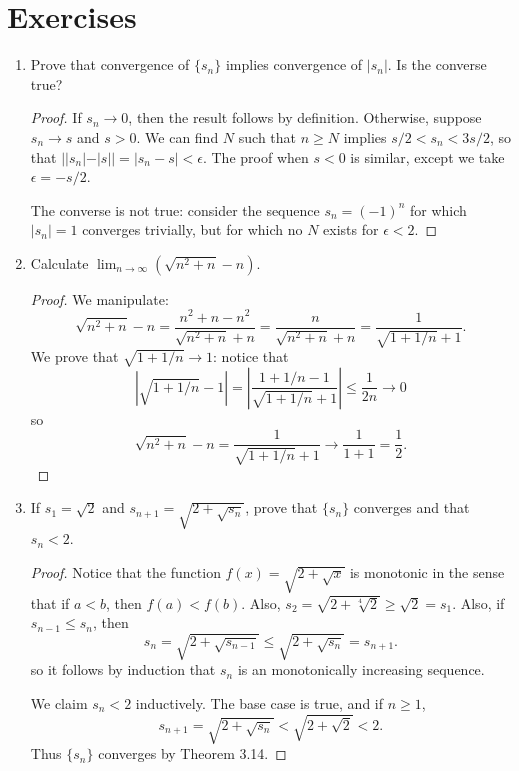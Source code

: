 \section{Exercises}

\begin{enumerate}
\item %
Prove that convergence of $\{s_n\}$ implies convergence of $|s_n|$. Is the converse true?

\begin{proof}
If $s_n \to 0$, then the result follows by definition. Otherwise, suppose $s_n \to s$ and $s > 0$. We can find $N$ such that $n \ge N$ implies $s/2 < s_n < 3s/2$, so that $||s_n| - |s|| = |s_n - s| < \epsilon$. The proof when $s < 0$ is similar, except we take $\epsilon = -s/2$.

The converse is not true: consider the sequence $s_n = (-1)^{n}$ for which $|s_n| = 1$ converges trivially, but for which no $N$ exists for $\epsilon < 2$.
\end{proof}

\item %
Calculate $\lim_{n \to \infty} (\sqrt{n^2 + n} - n)$.

\begin{proof}
We manipulate:
\[
	\sqrt{n^2 + n} - n = \frac{n^2 + n - n^2}{\sqrt{n^2 + n} + n} = \frac{n}{\sqrt{n^2 + n} + n} = \frac{1}{\sqrt{1 + 1/n} + 1}.
\]
We prove that $\sqrt{1+1/n} \to 1$: notice that
\[
	|\sqrt{1+1/n} - 1| = \left| \frac{1 + 1/n - 1}{\sqrt{1 + 1/n} + 1} \right| \le \frac{1}{2n} \to 0
\]
so 
\[
	\sqrt{n^2 + n} - n = \frac{1}{\sqrt{1 + 1/n} + 1} \to \frac{1}{1 + 1} = \frac{1}{2}.
\]
\end{proof}

\item %
If $s_1 = \sqrt{2}$ and $s_{n+1} = \sqrt{2 + \sqrt{s_n}}$, prove that $\{s_n\}$ converges and that $s_n < 2$.

\begin{proof}
Notice that the function $f(x) = \sqrt{2 + \sqrt{x}}$ is monotonic in the sense that if $a < b$, then $f(a) < f(b)$. Also, $s_2 = \sqrt{2 + \sqrt[4]{2}} \ge \sqrt{2} = s_1$. Also, if $s_{n-1} \le s_n$, then
\[
	s_n = \sqrt{2 + \sqrt{s_{n-1}}} \le \sqrt{2 + \sqrt{s_n}} = s_{n+1}.
\]
so it follows by induction that $s_n$ is an monotonically increasing sequence. 

We claim $s_n < 2$ inductively. The base case is true, and if $n \ge 1$,
\[
	s_{n+1} = \sqrt{2 + \sqrt{s_n}} < \sqrt{2 + \sqrt{2}} < 2.
\]
Thus $\{s_n\}$ converges by Theorem 3.14.
\end{proof}


\end{enumerate}
